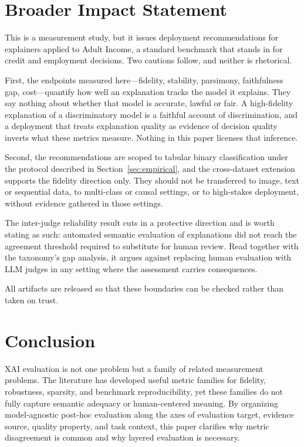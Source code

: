 \documentclass[10pt]{article}
\begin{document}
\section*{Broader Impact Statement}

This is a measurement study, but it issues deployment recommendations for
explainers applied to Adult Income, a standard benchmark that stands in for
credit and employment decisions. Two cautions follow, and neither is
rhetorical.

First, the endpoints measured here---fidelity, stability, parsimony,
faithfulness gap, cost---quantify how well an explanation tracks the model it
explains. They say nothing about whether that model is accurate, lawful or
fair. A high-fidelity explanation of a discriminatory model is a faithful
account of discrimination, and a deployment that treats explanation quality as
evidence of decision quality inverts what these metrics measure. Nothing in
this paper licenses that inference.

Second, the recommendations are scoped to tabular binary classification under
the protocol described in Section~\ref{sec:empirical}, and the cross-dataset
extension supports the fidelity direction only. They should not be transferred
to image, text or sequential data, to multi-class or causal settings, or to
high-stakes deployment, without evidence gathered in those settings.

The inter-judge reliability result cuts in a protective direction and is worth
stating as such: automated semantic evaluation of explanations did not reach
the agreement threshold required to substitute for human review. Read together
with the taxonomy's gap analysis, it argues against replacing human evaluation
with LLM judges in any setting where the assessment carries consequences.

All artifacts are released so that these boundaries can be checked rather than
taken on trust.

\section{Conclusion}
\label{sec:conclusion}

XAI evaluation is not one problem but a family of related measurement
problems. The literature has developed useful metric families for fidelity,
robustness, sparsity, and benchmark reproducibility, yet these families do
not fully capture semantic adequacy or human-centered meaning. By
organizing model-agnostic post-hoc evaluation along the axes of evaluation
target, evidence source, quality property, and task context, this paper
clarifies why metric disagreement is common and why layered evaluation is
necessary.
\end{document}
